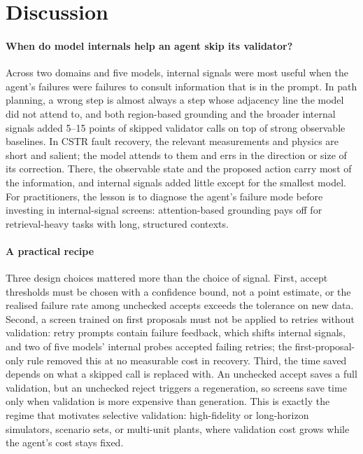 \section{Discussion}\label{sec:discussion}

\paragraph{When do model internals help an agent skip its validator?} Across two domains and five models, internal
signals were most useful when the agent's failures were failures to consult information that is in the prompt. In path
planning, a wrong step is almost always a step whose adjacency line the model did not attend to, and both
region-based grounding and the broader internal signals added 5--15 points of skipped validator calls on top of strong
observable baselines. In CSTR fault recovery, the relevant measurements and physics are short and salient; the model
attends to them and errs in the direction or size of its correction. There, the observable state and the proposed
action carry most of the information, and internal signals added little except for the smallest model. For
practitioners, the lesson is to diagnose the agent's failure mode before investing in internal-signal screens:
attention-based grounding pays off for retrieval-heavy tasks with long, structured contexts.

\paragraph{A practical recipe} Three design choices mattered more than the choice of signal. First, accept
thresholds must be chosen with a confidence bound, not a point estimate, or the realised failure rate among unchecked
accepts exceeds the tolerance on new data. Second, a screen trained on first proposals must not be applied to
retries without validation: retry prompts contain failure feedback, which shifts internal signals, and two of five
models' internal probes accepted failing retries; the first-proposal-only rule removed this at no measurable cost in
recovery. Third, the time saved depends on what a skipped call is replaced with. An unchecked accept saves a full
validation, but an unchecked reject triggers a regeneration, so screens save time only when validation is more
expensive than generation. This is exactly the regime that motivates selective validation: high-fidelity or
long-horizon simulators, scenario sets, or multi-unit plants, where validation cost grows while the agent's cost
stays fixed.

